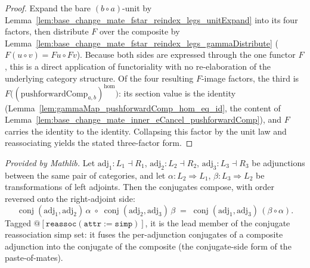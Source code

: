 \begin{proof}
  Expand the bare \((b \circ a)\)-unit by
  Lemma~\ref{lem:base_change_mate_fstar_reindex_legs_unitExpand} into its four factors, then distribute
  \(F\) over the composite by
  Lemma~\ref{lem:base_change_mate_fstar_reindex_legs_gammaDistribute}
  (\(F(u \circ v) = F u \circ F v\)). Because both sides are expressed through the one functor \(F\),
  this is a direct application of functoriality with no re-elaboration of the underlying category
  structure. Of the four resulting \(F\)-image factors, the third is
  \(F\bigl((\mathrm{pushforwardComp}_{a,b})^{\mathrm{hom}}\bigr)\): its section value is the identity
  (Lemma~\ref{lem:gammaMap_pushforwardComp_hom_eq_id}, the content of
  Lemma~\ref{lem:base_change_mate_inner_eCancel_pushforwardComp}), and \(F\) carries the identity to
  the identity. Collapsing this factor by the unit law and reassociating yields the stated three-factor
  form.
\end{proof}


\begin{lemma}
  \label{lem:conjugateEquiv_comp_mathlib}
  \mathlibok
  \textit{Provided by Mathlib.}
  Let \(\mathrm{adj}_1 : L_1 \dashv R_1\), \(\mathrm{adj}_2 : L_2 \dashv R_2\),
  \(\mathrm{adj}_3 : L_3 \dashv R_3\) be adjunctions between the same pair of categories, and let
  \(\alpha : L_2 \Rightarrow L_1\), \(\beta : L_3 \Rightarrow L_2\) be transformations of left adjoints.
  Then the conjugates compose, with order reversed onto the right-adjoint side:
  \[
    \operatorname{conj}(\mathrm{adj}_1,\mathrm{adj}_2)\,\alpha \;\circ\;
    \operatorname{conj}(\mathrm{adj}_2,\mathrm{adj}_3)\,\beta
      \;=\; \operatorname{conj}(\mathrm{adj}_1,\mathrm{adj}_3)\,(\beta \circ \alpha) .
  \]
  Tagged \(\mathtt{@[reassoc (attr := simp)]}\), it is the lead member of the conjugate
  reassociation simp set: it fuses the per-adjunction conjugates of a composite adjunction into the
  conjugate of the composite (the conjugate-side form of the paste-of-mates).
\end{lemma}

